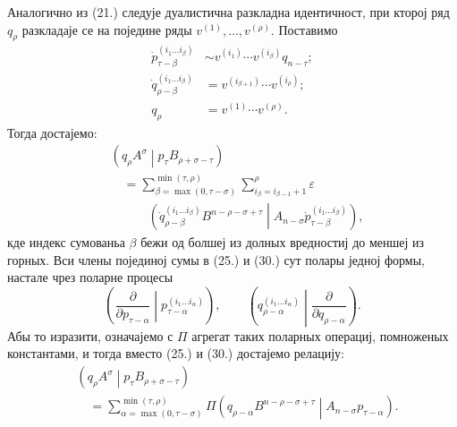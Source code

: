 \documentclass[11pt]{article}
\newcommand{\pair}[2]{\left(#1\middle|#2\right)}
\newcommand{\eps}{\varepsilon}
\begin{document}
Аналогично из (21.) следује дуалистична разкладна идентичност, при кторој ряд $q_\rho$ разкладаје се на поједине ряды $v^{(1)},\ldots,v^{(\rho)}$. Поставимо
\begin{equation}
\begin{aligned}
 \dot p_{\tau-\beta}^{(i_1\ldots i_\beta)}
&\sim v^{(i_1)}\cdots v^{(i_\beta)}q_{n-\tau};\\
 \dot q_{\rho-\beta}^{(i_1\ldots i_\beta)}
&=v^{(i_{\beta+1})}\cdots v^{(i_\rho)};\\
 q_\rho&=v^{(1)}\cdots v^{(\rho)}.
\end{aligned}
\tag{29}
\end{equation}
Тогда достајемо:
\begin{equation}
\begin{aligned}
&\pair{q_\rho A^\sigma}{p_\tau B_{\rho+\sigma-\tau}}\\
&\quad=\sum_{\beta=\max(0,\tau-\sigma)}^{\min(\tau,\rho)}
\sum_{i_\beta=i_{\beta-1}+1}^{\rho}\eps\\
&\qquad\quad\pair{\dot q_{\rho-\beta}^{(i_1\ldots i_\beta)}
B^{n-\rho-\sigma+\tau}}
{A_{n-\sigma}\dot p_{\tau-\beta}^{(i_1\ldots i_\beta)}} ,
\end{aligned}
\tag{30}
\end{equation}
кде индекс сумованьа $\beta$ бежи од болшеј из долных вредностиј до меншеј из горных. Вси члены појединој сумы в (25.) и (30.) сут полары једној формы, настале чрез поларне процесы
\[
\left(\frac{\partial}{\partial p_{\tau-\alpha}}\middle|
p_{\tau-\alpha}^{(i_1\ldots i_\alpha)}\right),\qquad
\left(q_{\rho-\alpha}^{(i_1\ldots i_\alpha)}\middle|
\frac{\partial}{\partial q_{\rho-\alpha}}\right).
\]
Абы то изразити, означајемо с $\Pi$ агрегат таких поларных операциј, помноженых константами, и тогда вместо (25.) и (30.) достајемо релацију:
\begin{equation}
\begin{aligned}
&\pair{q_\rho A^\sigma}{p_\tau B_{\rho+\sigma-\tau}}\\
&\quad=\sum_{\alpha=\max(0,\tau-\sigma)}^{\min(\tau,\rho)}
\Pi\pair{q_{\rho-\alpha}B^{n-\rho-\sigma+\tau}}
{A_{n-\sigma}p_{\tau-\alpha}}.
\end{aligned}
\tag{31}
\end{equation}
\end{document}
